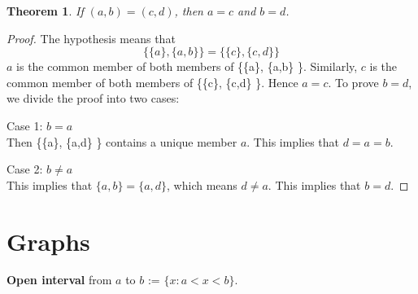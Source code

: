 \documentclass[a4paper,11pt,twoside]{book}
\theoremstyle{definition} \newtheorem{definition}{Definition}[chapter]
\theoremstyle{plain}      \newtheorem{id}{Lemma}
\newtheorem{thm}{Theorem}[chapter]
\theoremstyle{remark} \newtheorem*{ab}{Remark}
\begin{document}
  \begin{thm}
    If $(a,b) = (c,d)$, then $a = c$ and $b = d$.
  \end{thm}
  \begin{proof}
    The hypothesis means that
    \begin{equation*}
      \{\{a\}, \{a,b\} \} = \{\{c\}, \{c,d\} \}
    \end{equation*}
    $a$ is the common member of both members of \{\{a\}, \{a,b\} \}. Similarly,
    $c$ is the common member of both members of \{\{c\}, \{c,d\} \}. Hence $a = c$.
    To prove $b = d$, we divide the proof into two cases:

    Case 1: $b = a$ \\
    Then \{\{a\}, \{a,d\} \} contains a unique member $a$. This implies that $d = a = b$.

    Case 2: $b \neq a$ \\
    This implies that $\{ a,b \} = \{ a,d \}$, which means $d \neq a$. This implies
    that $b = d$.
  \end{proof}

  \chapter{Graphs}
  \textbf{Open interval} from $a$ to $b$ := $\{x: a < x < b\}$.

  \begin{center}
  \end{center}

  
\end{document}
